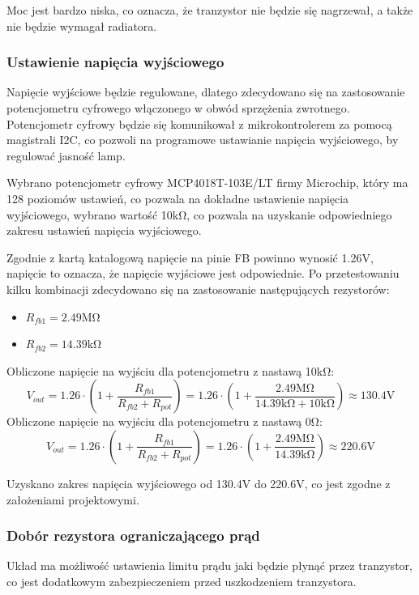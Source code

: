 \documentclass[../../main.tex]{subfiles}
\begin{document}
Moc jest bardzo niska, co oznacza, że tranzystor nie będzie się nagrzewał, a także nie będzie wymagał radiatora.

\subsubsection{Ustawienie napięcia wyjściowego}
Napięcie wyjściowe będzie regulowane, dlatego zdecydowano się na zastosowanie potencjometru cyfrowego włączonego w obwód sprzężenia zwrotnego.
Potencjometr cyfrowy będzie się komunikował z mikrokontrolerem za pomocą magistrali I2C, co pozwoli na programowe ustawianie napięcia wyjściowego,
by regulować jasność lamp.

Wybrano potencjometr cyfrowy MCP4018T-103E/LT firmy Microchip,
który ma 128 poziomów ustawień, co pozwala na dokładne ustawienie napięcia wyjściowego,
wybrano wartość 10k\si{\ohm}, co pozwala na uzyskanie odpowiedniego zakresu ustawień napięcia wyjściowego.

Zgodnie z kartą katalogową napięcie na pinie FB powinno wynosić 1.26\si{\volt}, napięcie to oznacza, że napięcie wyjściowe jest odpowiednie. 
Po przetestowaniu kilku kombinacji zdecydowano się na zastosowanie następujących rezystorów:
\begin{itemize}
    \item $R_{fb1} = 2.49\si{\mega\ohm}$
    \item $R_{fb2} = 14.39\si{\kilo\ohm}$
\end{itemize}

Obliczone napięcie na wyjściu dla potencjometru z nastawą 10\si{\kilo\ohm}:
\begin{equation}
    V_{out} = 1.26 \cdot (1 + \frac{R_{fb1}}{R_{fb2} + R_{pot}}) = 1.26 \cdot (1 + \frac{2.49\si{\mega\ohm}}{14.39\si{\kilo\ohm} + 10\si{\kilo\ohm}}) \approx 130.4\si{\volt}
\end{equation}
Obliczone napięcie na wyjściu dla potencjometru z nastawą 0\si{\ohm}:
\begin{equation}
    V_{out} = 1.26 \cdot (1 + \frac{R_{fb1}}{R_{fb2} + R_{pot}}) = 1.26 \cdot (1 + \frac{2.49\si{\mega\ohm}}{14.39\si{\kilo\ohm}}) \approx 220.6\si{\volt}
\end{equation}

Uzyskano zakres napięcia wyjściowego od 130.4\si{\volt} do 220.6\si{\volt}, co jest zgodne z założeniami projektowymi.

\subsubsection{Dobór rezystora ograniczającego prąd}
Układ ma możliwość ustawienia limitu prądu jaki będzie płynąć przez tranzystor,
co jest dodatkowym zabezpieczeniem przed uszkodzeniem tranzystora.
\end{document}
